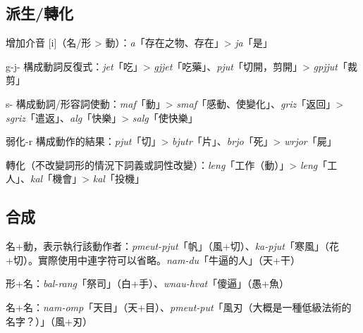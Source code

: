 \documentclass[UTF8]{ctexbook}
\begin{document}
\subsection{派生/轉化}
增加介音 [i]（名/形 > 動）：\textit{a}「存在之物、存在」> \textit{ja}「是」\par
g-j- 構成動詞反復式：\textit{jet}「吃」> \textit{gjjet}「吃藥」、\textit{pjut}「切開，剪開」> \textit{gpjjut}「裁剪」\par
s- 構成動詞/形容詞使動：\textit{maf}「動」> \textit{smaf}「感動、使變化」、\textit{griz}「返回」> \textit{sgriz}「遣返」、\textit{alg}「快樂」> \textit{salg}「使快樂」 \par
弱化-r 構成動作的結果：\textit{pjut}「切」> \textit{bjutr}「片」、\textit{brjo}「死」> \textit{wrjor}「屍」\par
轉化（不改變詞形的情況下詞義或詞性改變）：\textit{leng}「工作（動）」> \textit{leng}「工人」、\textit{kal}「機會」> \textit{kal}「投機」\par

\subsection{合成}
名+動，表示執行該動作者：\textit{pmeut-pjut}「帆」（風+切）、\textit{ka-pjut}「寒風」（花+切）。實際使用中連字符可以省略。\textit{nam-du}「牛逼的人」（天+干） \par
形+名：\textit{bal-rang}「祭司」（白+手）、\textit{wnau-hvat}「傻逼」（愚+魚）\par
名+名：\textit{nam-omp}「天目」（天+目）、\textit{pmeut-put}「風刃（大概是一種低級法術的名字？）」（風+刃）\par
\end{document}
